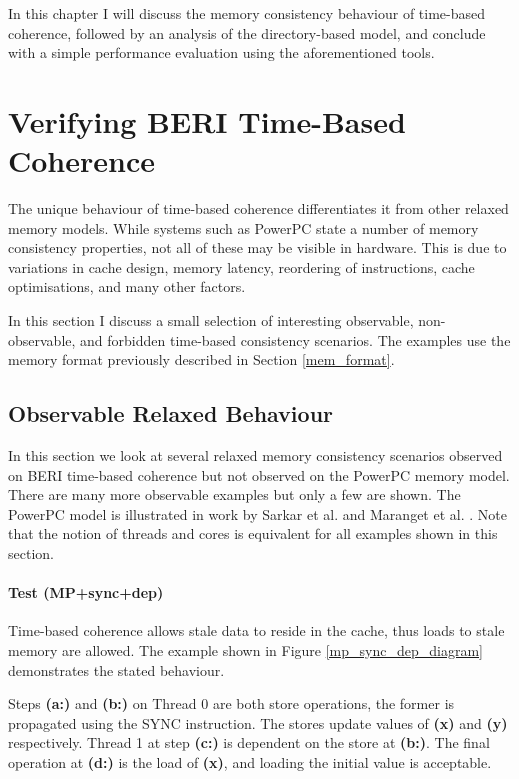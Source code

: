 		In this chapter I will discuss the memory consistency behaviour of time-based coherence, followed by an analysis of the directory-based model, and conclude with a simple performance evaluation using the aforementioned tools.


\section{Verifying BERI Time-Based Coherence}
		The unique behaviour of time-based coherence differentiates it from other relaxed memory models. While systems such as PowerPC state a number of memory consistency properties, not all of these may be visible in hardware. This is due to variations in cache design, memory latency, reordering of instructions, cache optimisations, and many other factors.
		
		In this section I discuss a small selection of interesting observable, non-observable, and forbidden time-based consistency scenarios. The examples use the memory format previously described in Section \ref{mem_format}.

\clearpage
		\subsection{Observable Relaxed Behaviour}
		In this section we look at several relaxed memory consistency scenarios observed on BERI time-based coherence but not observed on the PowerPC memory model. 
		There are many more observable examples but only a few are shown.
		The PowerPC model is illustrated in work by Sarkar et al. and Maranget et al. \cite{Sarkar11,Maranget12}.
		Note that the notion of threads and cores is equivalent for all examples shown in this section.
		
\paragraph{Test (MP+sync+dep)}
		Time-based coherence allows stale data to reside in the cache, thus loads to stale memory are allowed. The example shown in Figure \ref{mp_sync_dep_diagram} demonstrates the stated behaviour.
		
		Steps \textbf{(a:)} and \textbf{(b:)} on Thread 0 are both store operations, the former is propagated using the SYNC instruction. The stores update values of \textbf{(x)} and \textbf{(y)} respectively. Thread 1 at step \textbf{(c:)} is dependent on the store at \textbf{(b:)}. The final operation at \textbf{(d:)} is the load of \textbf{(x)}, and loading the initial value is acceptable.
		
